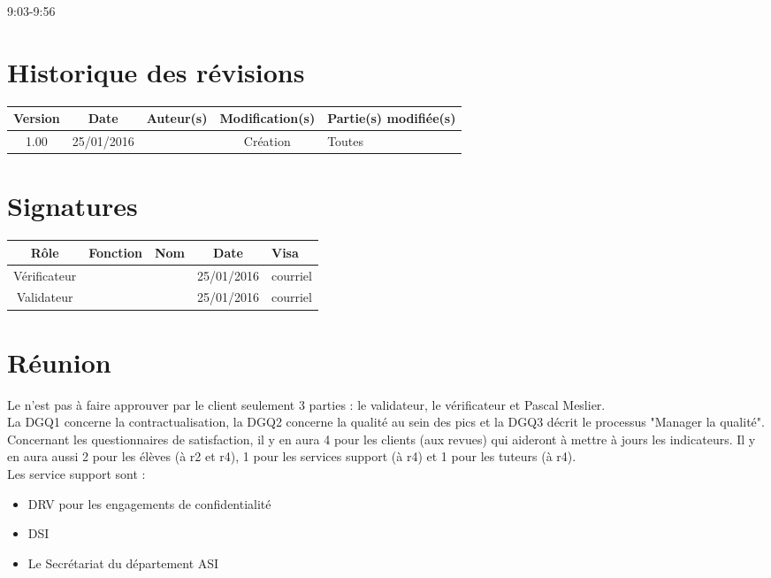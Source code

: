\documentclass [a4paper] {article}
\begin{document}
\rhead{}
\hfill   
\hfill 	9:03-9:56 				%



\section*{Historique des révisions}
\begin{center}
			\begin{tabular}{| c | c | c | c | p{4cm} |}
				\hline
				\rowcolor{Gray}
				Version & Date & Auteur(s) & Modification(s) & Partie(s) modifiée(s)		 \\
				\hline
				1.00 & 25/01/2016 & \Pierre & Création & Toutes \\
		\hline		
			\end{tabular}
		\end{center}

\section*{Signatures}

		\begin{center}
			\begin{tabular}{| c | c | c | c | p{4cm} |}
				\hline
				\rowcolor{Gray}
				Rôle & Fonction & Nom & Date & Visa		 \\
				\hline
				Vérificateur & \RQA & \Kafui & 25/01/2016 & courriel \\[30pt]
				\hline
				Validateur & \CP & \Sergi & 25/01/2016 & courriel \\[30pt]	
				\hline
			\end{tabular}
		\end{center}


\section{Réunion}
Le \PQ{} n'est pas à faire approuver par le client seulement 3 parties : le validateur, le vérificateur et Pascal Meslier.
\\
La DGQ1 concerne la contractualisation, la DGQ2 concerne la qualité au sein des pics et la DGQ3 décrit le processus "Manager la qualité".
\\
Concernant les questionnaires de satisfaction, il y en aura 4 pour les clients (aux revues) qui aideront à mettre à jours les indicateurs. Il y en aura aussi 2 pour les élèves (à r2 et r4), 1 pour les services support (à r4) et 1 pour les tuteurs (à r4).
\\
Les service support sont : 
\begin{itemize}
\item DRV pour les engagements de confidentialité
\item DSI
\item Le Secrétariat du département ASI
\end{itemize}
\end{document}
